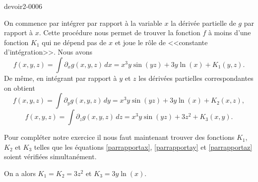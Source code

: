 \begin{corrige}{devoir2-0006}

On commence par intégrer par rapport à la variable $x$ la dérivée partielle de $g$ par rapport à $x$. Cette procédure nous permet de trouver la fonction $f$ à moins d'une fonction $K_1$ qui ne dépend pas de $x$ et joue le rôle de <<constante d'intégration>>. Nous avons
\begin{equation}\label{parrapportax}
 f(x,y,z)= \int \partial_x g(x,y,z)\, dx= x^3y\sin(y z)+ 3y\ln(x)+K_1 (y,z).  
\end{equation} 
De même, en intégrant par rapport à $y$ et $z$ les dérivées partielles correspondantes on obtient
\begin{equation}\label{parrapportay}
f(x,y,z)= \int \partial_y g(x,y,z)\, dy= x^3y\sin(y z)+ 3y\ln(x)+K_2 (x,z), 
\end{equation} 
\begin{equation}\label{parrapportaz}
f(x,y,z)= \int \partial_z g(x,y,z)\, dz= x^3y\sin(y z)+ 3z^2+K_3 (x,y). 
\end{equation}  

Pour compléter notre exercice il nous faut maintenant trouver des fonctions $K_1$, $K_2$ et $K_3$ telles que les équations \eqref{parrapportax}, \eqref{parrapportay} et \eqref{parrapportaz} soient vérifiées simultanément.

On a alors $K_1=K_2=3z^2$  et $K_3= 3y\ln(x)$.
\end{corrige}
